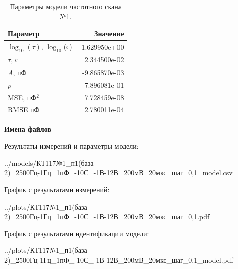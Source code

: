 \begin{table}[!ht]
    \centering
    \caption{Параметры модели частотного скана №1.}
    \begin{tabular}{|l|r|}
        \hline
        Параметр                                       & Значение                  \\ \hline
        $\log_{10}(\tau)$, $\log_{10}$(с)              & -1.629950e+00             \\ \hline
        $\tau$, с                                      & 2.344500e-02              \\ \hline
        $A$, пФ                                        & -9.865870e-03             \\ \hline
        $p$                                            & 7.896081e-01              \\ \hline
        MSE, пФ$^2$                                    & 7.728459e-08              \\ \hline
        RMSE пФ                                        & 2.780011e-04              \\ \hline
    \end{tabular}
    \label{table:frequency_scan_model_1}
\end{table}

\textbf{Имена файлов}

Результаты измерений и параметры модели:

\scriptsize../models/КТ117№1\_п1(база 2)\_2500Гц-1Гц\_1пФ\_-10С\_-1В-12В\_200мВ\_20мкс\_шаг\_0,1\_model.csv
\normalsize

График с результатами измерений:

\scriptsize../plots/КТ117№1\_п1(база 2)\_2500Гц-1Гц\_1пФ\_-10С\_-1В-12В\_200мВ\_20мкс\_шаг\_0,1.pdf
\normalsize

График с результатами идентификации модели:

\scriptsize../plots/КТ117№1\_п1(база 2)\_2500Гц-1Гц\_1пФ\_-10С\_-1В-12В\_200мВ\_20мкс\_шаг\_0,1\_model.pdf
\normalsize

